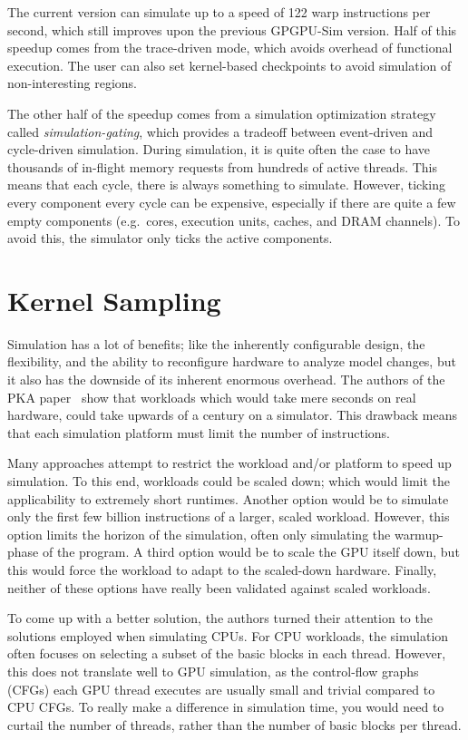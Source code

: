 The current version can simulate up to a speed of 122 warp instructions per second, which still improves upon the previous GPGPU-Sim version.
Half of this speedup comes from the trace-driven mode, which avoids overhead of functional execution.
The user can also set kernel-based checkpoints to avoid simulation of non-interesting regions.

The other half of the speedup comes from a simulation optimization strategy called \textit{simulation-gating}, which provides a tradeoff between event-driven and cycle-driven simulation.
During simulation, it is quite often the case to have thousands of in-flight memory requests from hundreds of active threads.
This means that each cycle, there is always something to simulate.
However, ticking every component every cycle can be expensive, especially if there are quite a few empty components (e.g.\ cores, execution units, caches, and DRAM channels).
To avoid this, the simulator only ticks the active components.

\section{Kernel Sampling}\label{sec:kernel-sampling}
Simulation has a lot of benefits; like the inherently configurable design, the flexibility, and the ability to reconfigure hardware to analyze model changes, but it also has the downside of its inherent enormous overhead.
The authors of the PKA paper~\cite{pks} show that workloads which would take mere seconds on real hardware, could take upwards of a century on a simulator.
This drawback means that each simulation platform must limit the number of instructions.

Many approaches attempt to restrict the workload and/or platform to speed up simulation.
To this end, workloads could be scaled down; which would limit the applicability to extremely short runtimes.
Another option would be to simulate only the first few billion instructions of a larger, scaled workload.
However, this option limits the horizon of the simulation, often only simulating the warmup-phase of the program.
A third option would be to scale the GPU itself down, but this would force the workload to adapt to the scaled-down hardware.
Finally, neither of these options have really been validated against scaled workloads.

To come up with a better solution, the authors turned their attention to the solutions employed when simulating CPUs.
For CPU workloads, the simulation often focuses on selecting a subset of the basic blocks in each thread.
However, this does not translate well to GPU simulation, as the control-flow graphs (CFGs) each GPU thread executes are usually small and trivial compared to CPU CFGs.
To really make a difference in simulation time, you would need to curtail the number of threads, rather than the number of basic blocks per thread.

